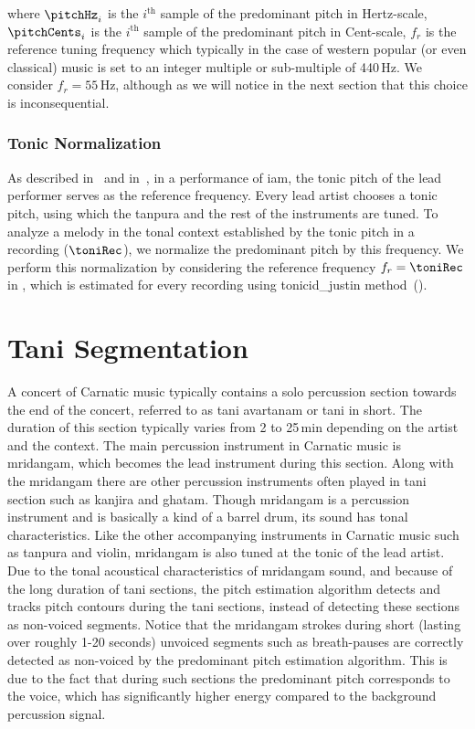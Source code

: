 {\noindent where $\pitchHz_i$ is the $i^\mathrm{th}$ sample of the predominant pitch in Hertz-scale, $\pitchCents_i$ is the $i^\mathrm{th}$ sample of the predominant pitch in Cent-scale, $f_r$ is the reference tuning frequency which typically in the case of western popular (or even classical) music is set to an integer multiple or sub-multiple of 440\,Hz. We consider $f_r=55$\,Hz, although as we will notice in the next section that this choice is inconsequential.
  

\subsubsection{Tonic Normalization}
\label{sec:tonic_normalization}

As described in~ and in~, in a performance of \gls{iam}, the tonic pitch of the lead performer serves as the reference frequency. Every lead artist chooses a tonic pitch, using which the \gls{tanpura} and the rest of the instruments are tuned. To analyze a melody in the tonal context established by the tonic pitch in a recording ($\toniRec$), we normalize the predominant pitch by this frequency. We perform this normalization by considering the reference frequency $f_r=\toniRec$ in , which is estimated for every recording using \acrshort{tonicid_justin} method~().


\section{Tani Segmentation}
\label{sec:pre_processing_tani_segmentation}

A concert of Carnatic music typically contains a solo percussion section towards the end of the concert, referred to as \gls{tani} avartanam or \gls{tani} in short. The duration of this section typically varies from 2 to 25\,min depending on the artist and the context. The main percussion instrument in Carnatic music is \gls{mridangam}, which becomes the lead instrument during this section. Along with the \gls{mridangam} there are other percussion instruments often played in \gls{tani} section such as \gls{kanjira} and \gls{ghatam}. Though \gls{mridangam} is a percussion instrument and is basically a kind of a barrel drum, its sound has tonal characteristics. Like the other accompanying instruments in Carnatic music such as \gls{tanpura} and violin, \gls{mridangam} is also tuned at the tonic of the lead artist. Due to the tonal acoustical characteristics of \gls{mridangam} sound, and because of the long duration of \gls{tani} sections, the pitch estimation algorithm detects and tracks pitch contours during the \gls{tani} sections, instead of detecting these sections as non-voiced segments. Notice that the \gls{mridangam} strokes during short (lasting over roughly 1-20 seconds) unvoiced segments such as breath-pauses are correctly detected as non-voiced by the predominant pitch estimation algorithm. This is due to the fact that during such sections the predominant pitch corresponds to the voice, which has significantly higher energy compared to the background percussion signal. 


}
